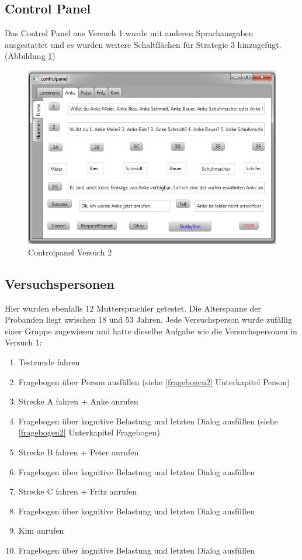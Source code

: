 \documentclass[12pt,a4paper]{scrartcl}
\begin{document}
\subsection{Control Panel}
Das Control Panel aus Versuch 1 wurde mit anderen Sprachausgaben ausgestattet und es wurden weitere Schaltflächen für Strategie 3 hinzugefügt. (Abbildung \ref{cp2})
\begin{figure}[H]
\includegraphics[width=13cm]{controlpanel2.png}
\caption{Controlpanel Versuch 2}
\label{cp2}
\end{figure}


\subsection{Versuchspersonen}

Hier wurden ebenfalls 12 Muttersprachler getestet. Die Alterspanne der Probanden liegt zwischen 18 und 53 Jahren. Jede Versuchsperson wurde zufällig einer Gruppe zugewiesen und hatte dieselbe Aufgabe wie die Versuchspersonen in Versuch 1: 
\begin{enumerate}
\item Testrunde fahren
\item Fragebogen über Person ausfüllen (siehe \ref{fragebogen2} Unterkapitel Person)
\item Strecke A fahren + Anke anrufen
\item Fragebogen über kognitive Belastung und letzten Dialog ausfüllen (siehe \ref{fragebogen2} Unterkapitel Fragebogen)
\item Strecke B fahren + Peter anrufen
\item Fragebogen über kognitive Belastung und letzten Dialog ausfüllen
\item Strecke C fahren + Fritz anrufen
\item Fragebogen über kognitive Belastung und letzten Dialog ausfüllen 
\item Kim anrufen
\item Fragebogen über kognitive Belastung und letzten Dialog ausfüllen 
\end{enumerate}
\end{document}
